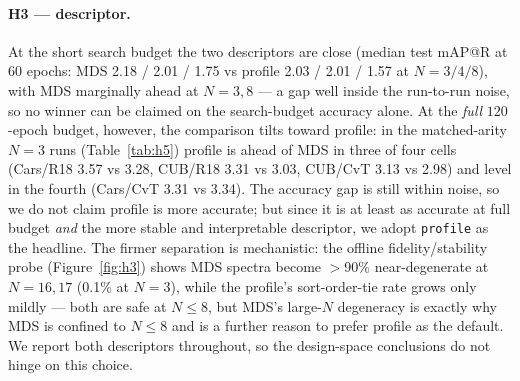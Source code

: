\documentclass[11pt,letterpaper]{article}
\begin{document}
%
\paragraph{H3 --- descriptor.} At the short search budget the two descriptors are close
(median test mAP@R at 60 epochs: MDS 2.18 / 2.01 / 1.75 vs profile 2.03 / 2.01 / 1.57 at
$N{=}3/4/8$), with MDS marginally ahead at $N{=}3,8$ --- a gap well inside the run-to-run
noise, so no winner can be claimed on the search-budget accuracy alone. At the
\emph{full} $120$-epoch budget, however, the comparison tilts toward profile: in the
matched-arity $N{=}3$ runs (Table~\ref{tab:h5}) profile is ahead of MDS in three of four
cells (Cars/R18 3.57 vs 3.28, CUB/R18 3.31 vs 3.03, CUB/CvT 3.13 vs 2.98) and level in
the fourth (Cars/CvT 3.31 vs 3.34). The accuracy gap is still within noise, so we do not
claim profile is more accurate; but since it is at least as accurate at full budget
\emph{and} the more stable and interpretable descriptor, we adopt \texttt{profile} as the
headline. The firmer separation is mechanistic: the offline fidelity/stability probe
(Figure~\ref{fig:h3}) shows MDS spectra become $>$90\% near-degenerate at $N{=}16,17$
(0.1\% at $N{=}3$), while the profile's sort-order-tie rate grows only mildly --- both are
safe at $N \leq 8$, but MDS's large-$N$ degeneracy is exactly why MDS is confined to
$N \leq 8$ and is a further reason to prefer profile as the default. We report both
descriptors throughout, so the design-space conclusions do not hinge on this choice.
\end{document}
